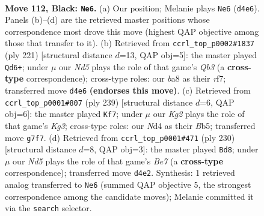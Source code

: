 \documentclass[11pt]{article}
\begin{document}
\clearpage

\begin{figure}[p]\centering
\begin{subfigure}{0.46\textwidth}\centering
\resizebox{\linewidth}{!}{%
\newchessgame
\chessboard[
  setfen={B7/2P3k1/8/6P1/3n2KP/8/8/8 b - - 0 112},
  showmover=false,
  pgfstyle=straightmove, color=movearrow, markmove={d4-e6}
]}
\caption{}
\end{subfigure}\hfill
\begin{subfigure}{0.46\textwidth}\centering
\resizebox{\linewidth}{!}{%
\newchessgame
\chessboard[
  setfen={8/5R2/1q5p/8/8/7P/4k1PK/8 b - - 7 111},
  showmover=false,
  pgfstyle=straightmove, color=movearrow, markmove={b6-d6}
]}
\caption{}
\end{subfigure}
\\[4pt]
\begin{subfigure}{0.46\textwidth}\centering
\resizebox{\linewidth}{!}{%
\newchessgame
\chessboard[
  setfen={8/8/6k1/1b6/4P3/B3KP2/8/8 b - - 64 120},
  showmover=false,
  pgfstyle=straightmove, color=movearrow, markmove={g6-f7}
]}
\caption{}
\end{subfigure}\hfill
\begin{subfigure}{0.46\textwidth}\centering
\resizebox{\linewidth}{!}{%
\newchessgame
\chessboard[
  setfen={8/4B3/6p1/5k2/6p1/2b5/6K1/8 w - - 64 116},
  showmover=false,
  pgfstyle=straightmove, color=movearrow, markmove={e7-d8}
]}
\caption{}
\end{subfigure}
\caption{\textbf{Move 112, Black: \texttt{Ne6}.} (a) Our position; Melanie plays \texttt{Ne6} (\texttt{d4e6}). Panels (b)--(d) are the retrieved master positions whose correspondence most drove this move (highest QAP objective among those that transfer to it). (b) Retrieved from \texttt{ccrl\_top\_p0002\#1837} (ply 221) [structural distance $d$=13, QAP obj=5]: the master played \texttt{Qd6+}; under $\mu$ our \emph{Nd5} plays the role of that game's \emph{Qb3} (a \textbf{cross-type} correspondence); cross-type roles: our \emph{b}a8 as their \emph{r}f7; transferred move \texttt{d4e6} \textbf{(endorses this move)}. (c) Retrieved from \texttt{ccrl\_top\_p0001\#807} (ply 239) [structural distance $d$=6, QAP obj=6]: the master played \texttt{Kf7}; under $\mu$ our \emph{Kg2} plays the role of that game's \emph{Kg3}; cross-type roles: our \emph{N}d4 as their \emph{B}b5; transferred move \texttt{g7f7}. (d) Retrieved from \texttt{ccrl\_top\_p0001\#471} (ply 230) [structural distance $d$=8, QAP obj=3]: the master played \texttt{Bd8}; under $\mu$ our \emph{Nd5} plays the role of that game's \emph{Be7} (a \textbf{cross-type} correspondence); transferred move \texttt{d4e2}. Synthesis: 1 retrieved analog transferred to \texttt{Ne6} (summed QAP objective 5, the strongest correspondence among the candidate moves); Melanie committed it via the \texttt{search} selector.}
\label{fig:thought-m223}
\end{figure}
\end{document}
